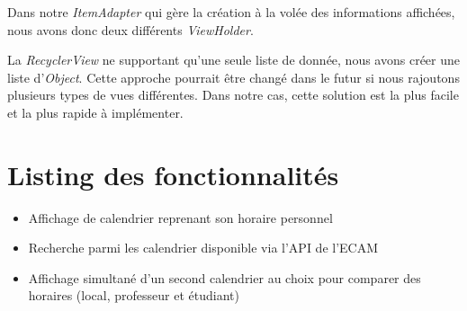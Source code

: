 \documentclass{article}
\begin{document}
            Dans notre \textit{ItemAdapter} qui gère la création à la volée des informations
            affichées, nous avons donc deux différents \textit{ViewHolder}.

            La \textit{RecyclerView} ne supportant qu'une seule liste de donnée, nous avons créer
            une liste d'\textit{Object}. Cette approche pourrait être changé dans le futur si nous
            rajoutons plusieurs types de vues différentes. Dans notre cas, cette solution est la
            plus facile et la plus rapide à implémenter.

	\section{Listing des fonctionnalités}
    \begin{itemize}
        \item Affichage de calendrier reprenant son horaire personnel
        \item Recherche parmi les calendrier disponible via l'API de l'ECAM
        \item Affichage simultané d'un second calendrier au choix pour comparer des horaires (local, professeur et étudiant)
    \end{itemize}
\end{document}
